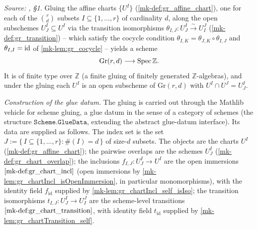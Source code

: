 \begin{definition}\label{mk-def:gr_glued_scheme}
  \leanok

  \textit{Source: \cite{nitsure-hilbert-quot}, \S 1.}
  Gluing the affine charts \(\{U^I\}\) (\ref{mk-def:gr_affine_chart}), one for each
  of the \(\binom{r}{d}\) subsets \(I \subseteq \{1,\dots,r\}\) of cardinality
  \(d\), along the open subschemes \(U^I_J \subseteq U^I\) via the transition
  isomorphisms \(\theta_{I,J} : U^I_J \xrightarrow{\sim} U^J_I\)
  (\ref{mk-def:gr_transition}) -- which satisfy the cocycle condition
  \(\theta_{I,K} = \theta_{J,K} \circ \theta_{I,J}\) and \(\theta_{I,I} = \operatorname{id}\)
  of \ref{mk-lem:gr_cocycle} -- yields a scheme
  \[
    \mathrm{Gr}(r,d) \longrightarrow \operatorname{Spec} \mathbb{Z}.
  \]
  It is of finite type over \(\mathbb{Z}\) (a finite gluing of finitely
  generated \(\mathbb{Z}\)-algebras), and under the gluing each \(U^I\) is an
  open subscheme of \(\mathrm{Gr}(r,d)\) with \(U^I \cap U^J = U^I_J\).

  \emph{Construction of the glue datum.} The gluing is carried out through the
  Mathlib vehicle for scheme gluing, a glue datum in the sense of a category of
  schemes (the structure \(\mathtt{Scheme.GlueData}\), extending the abstract
  glue-datum interface). Its data are supplied as follows. The index set is the
  set \(J := \{\, I \subseteq \{1,\dots,r\} : \#(I) = d \,\}\) of size-\(d\)
  subsets. The objects are the charts \(U^I\) (\ref{mk-def:gr_affine_chart}); the
  pairwise overlaps are the schemes \(U^I_J\) (\ref{mk-def:gr_chart_overlap}); the
  inclusions \(f_{I,J} : U^I_J \to U^I\) are the open immersions
  \(\ref{mk-def:gr_chart_incl}\) (open immersions by
  \ref{mk-lem:gr_chartIncl_isOpenImmersion}, in particular monomorphisms), with the
  identity field \(f_{\mathrm{id}}\) supplied by
  \ref{mk-lem:gr_chartIncl_self_isIso}; the transition isomorphisms
  \(t_{I,J} : U^I_J \to U^J_I\) are the scheme-level transitions
  \(\ref{mk-def:gr_chart_transition}\), with identity field \(t_{\mathrm{id}}\)
  supplied by \ref{mk-lem:gr_chartTransition_self}.


\end{definition}
